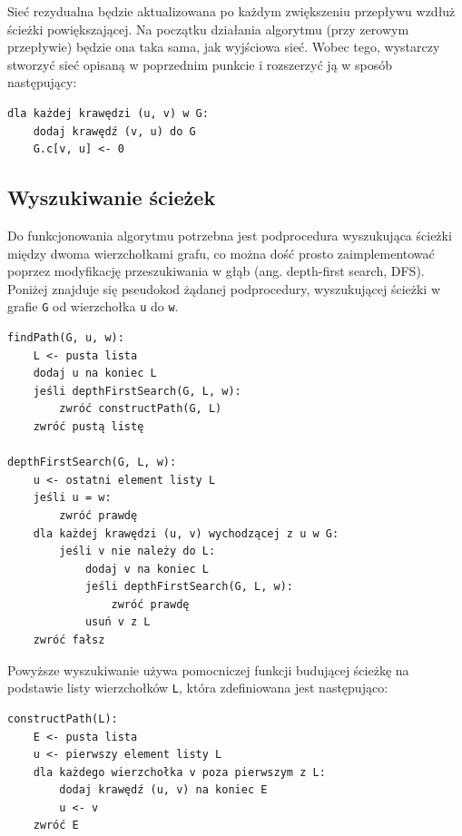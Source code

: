 \documentclass[12pt,a4paper]{article}
\theoremstyle{definition}
\begin{document}
\noindent
Sieć rezydualna będzie aktualizowana po każdym zwiększeniu przepływu wzdłuż ścieżki powiększającej. Na początku działania algorytmu (przy zerowym przepływie) będzie ona taka sama, jak wyjściowa sieć. Wobec tego, wystarczy stworzyć sieć opisaną w poprzednim punkcie i rozszerzyć ją w sposób następujący:\\

\begin{tcolorbox}[title=Rozszerzenie konstrukcji sieci podstawowej]
\begin{verbatim}
dla każdej krawędzi (u, v) w G:
    dodaj krawędź (v, u) do G
    G.c[v, u] <- 0
\end{verbatim}
\end{tcolorbox}

\subsection{Wyszukiwanie ścieżek}
Do funkcjonowania algorytmu potrzebna jest podprocedura wyszukująca ścieżki między dwoma wierzchołkami grafu, co można dość prosto zaimplementować poprzez modyfikację przeszukiwania w głąb (ang. depth-first search, DFS). Poniżej znajduje się pseudokod żądanej podprocedury, wyszukującej ścieżki w grafie \texttt{G} od wierzchołka \texttt{u} do \texttt{w}.\\

\begin{tcolorbox}[title=Wyszukiwanie ścieżek w grafie]
\begin{verbatim}
findPath(G, u, w):
    L <- pusta lista
    dodaj u na koniec L
    jeśli depthFirstSearch(G, L, w):
        zwróć constructPath(G, L)
    zwróć pustą listę

depthFirstSearch(G, L, w):
    u <- ostatni element listy L
    jeśli u = w:
        zwróć prawdę
    dla każdej krawędzi (u, v) wychodzącej z u w G:
        jeśli v nie należy do L:
            dodaj v na koniec L
            jeśli depthFirstSearch(G, L, w):
                zwróć prawdę
            usuń v z L
    zwróć fałsz
\end{verbatim}
\end{tcolorbox}

\vspace{0.5em}
\noindent
Powyższe wyszukiwanie używa pomocniczej funkcji budującej ścieżkę na podstawie listy wierzchołków \texttt{L}, która zdefiniowana jest następująco:\\

\begin{tcolorbox}[title=Budowanie ścieżki na podstawie wierzchołków]
\begin{verbatim}
constructPath(L):
    E <- pusta lista
    u <- pierwszy element listy L
    dla każdego wierzchołka v poza pierwszym z L:
        dodaj krawędź (u, v) na koniec E
        u <- v
    zwróć E
\end{verbatim}
\end{tcolorbox}
\end{document}
